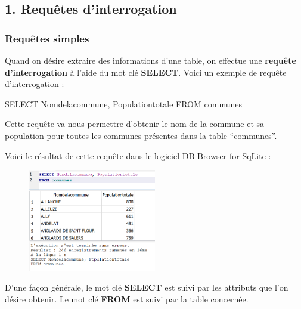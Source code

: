 \documentclass[
  a4paper,
  DIV=11,
  numbers=noendperiod]{scrartcl}
\newenvironment{Shaded}{\begin{snugshade}}{\end{snugshade}}
\newcommand{\KeywordTok}[1]{\textcolor[rgb]{0.00,0.23,0.31}{#1}}
\newcommand{\NormalTok}[1]{\textcolor[rgb]{0.00,0.23,0.31}{#1}}
\begin{document}
\hypertarget{requuxeates-dinterrogation}{%
\subsection{1. Requêtes
d'interrogation}\label{requuxeates-dinterrogation}}

\hypertarget{requuxeates-simples}{%
\subsubsection{Requêtes simples}\label{requuxeates-simples}}

Quand on désire extraire des informations d'une table, on effectue une
\textbf{requête d'interrogation} à l'aide du mot clé \textbf{SELECT}.
Voici un exemple de requête d'interrogation :

\begin{Shaded}
\begin{Highlighting}[]
\KeywordTok{SELECT}\NormalTok{ Nomdelacommune, Populationtotale}
\KeywordTok{FROM}\NormalTok{ communes}
\end{Highlighting}
\end{Shaded}

Cette requête va nous permettre d'obtenir le nom de la commune et sa
population pour toutes les communes présentes dans la table
``communes''.

Voici le résultat de cette requête dans le logiciel DB Browser for
SqLite :

\begin{figure}

{\centering \includegraphics[width=0.5\textwidth,height=\textheight]{SQL1.png}

}

\end{figure}

D'une façon générale, le mot clé \textbf{SELECT} est suivi par les
attributs que l'on désire obtenir. Le mot clé \textbf{FROM} est suivi
par la table concernée.
\end{document}
